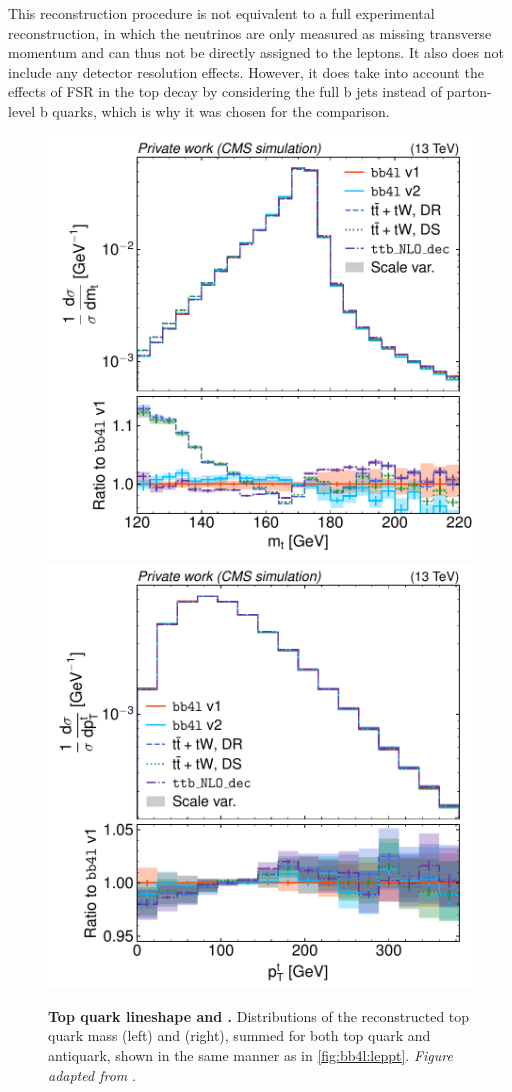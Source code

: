 This reconstruction procedure is not equivalent to a full experimental reconstruction, in which the neutrinos are only measured as missing transverse momentum and can thus not be directly assigned to the leptons. It also does not include any detector resolution effects. However, it does take into account the effects of FSR in the top decay by considering the full b jets instead of parton-level b quarks, which is why it was chosen for the comparison.

\begin{figure}[tp]
    \centering
    \includegraphics[width=0.49 \textwidth]{figures/bb4l/generators/MC_TTBAR_DILEP_SPINDENSITY_anytop_mass.pdf}
    \hfill
    \includegraphics[width=0.49 \textwidth]{figures/bb4l/generators/MC_TTBAR_DILEP_SPINDENSITY_anytop_pt.pdf}
    \caption{\textbf{Top quark lineshape and \pt.} Distributions of the reconstructed top quark mass (left) and \pt (right), summed for both top quark and antiquark, shown in the same manner as in \cref{fig:bb4l:leppt}. \textit{Figure adapted from }.}
    \label{fig:bb4l:top}
\end{figure}

